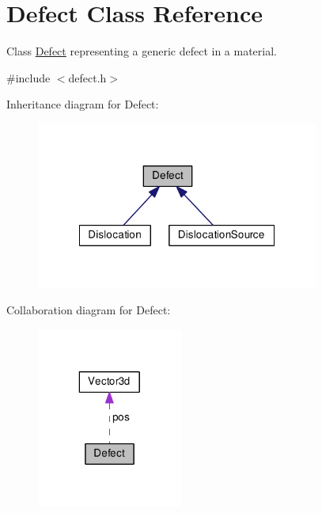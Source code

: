 \hypertarget{classDefect}{\section{Defect Class Reference}
\label{d5/d4f/classDefect}
}


Class \hyperlink{classDefect}{Defect} representing a generic defect in a material.  




{\ttfamily \#include $<$defect.\-h$>$}



Inheritance diagram for Defect\-:\nopagebreak
\begin{figure}[H]
\begin{center}
\leavevmode
\includegraphics[width=263pt]{de/d48/classDefect__inherit__graph}
\end{center}
\end{figure}


Collaboration diagram for Defect\-:\nopagebreak
\begin{figure}[H]
\begin{center}
\leavevmode
\includegraphics[width=136pt]{d7/d09/classDefect__coll__graph}
\end{center}
\end{figure}
